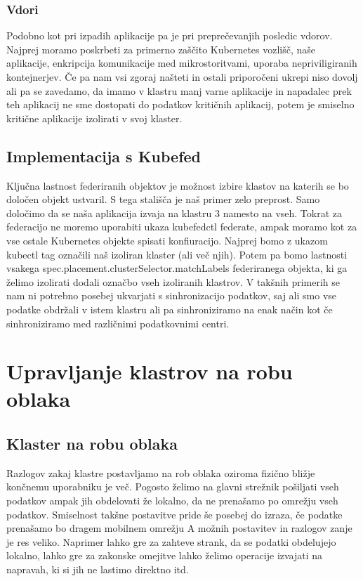 \documentclass[a4paper, 12pt]{book}
\begin{document}
\subsection{Vdori}
Podobno kot pri izpadih aplikacije pa je pri preprečevanjih posledic vdorov.
Najprej moramo poskrbeti za primerno zaščito Kubernetes vozlišč, naše aplikacije, enkripcija komunikacije med mikrostoritvami, uporaba nepriviligiranih kontejnerjev.
Če pa nam vsi zgoraj našteti in ostali priporočeni ukrepi niso dovolj ali pa se zavedamo, da imamo v klastru manj varne aplikacije in napadalec prek teh aplikacij ne sme dostopati do podatkov kritičnih aplikacij, potem je smiselno kritične aplikacije izolirati v svoj klaster.
\section{Implementacija s Kubefed}
Ključna lastnost federiranih objektov je možnost izbire klastov na katerih se bo določen objekt ustvaril. 
S tega stališča je naš primer zelo preprost.
Samo določimo da se naša aplikacija izvaja na klastru 3 namesto na vseh.
Tokrat za federacijo ne moremo uporabiti ukaza kubefedctl federate, ampak moramo kot za vse ostale Kubernetes objekte spisati konfiuracijo.
Najprej bomo z ukazom kubectl tag označili naš izoliran klaster (ali več njih).
Potem pa bomo lastnosti vsakega spec.placement.clusterSelector.matchLabels federiranega objekta, ki ga želimo izolirati dodali označbo vseh izoliranih klastrov.
V takšnih primerih se nam ni potrebno posebej ukvarjati s sinhronizacijo podatkov, saj ali smo vse podatke obdržali v istem klastru ali pa sinhroniziramo na enak način kot če sinhroniziramo med različnimi podatkovnimi centri.
\chapter{Upravljanje klastrov na robu oblaka}
\section{Klaster na robu oblaka}
Razlogov zakaj klastre postavljamo na rob oblaka oziroma fizično bližje končnemu uporabniku je več.
Pogosto želimo na glavni strežnik pošiljati vseh podatkov ampak jih obdelovati že lokalno, da ne prenašamo po omrežju vseh podatkov.
Smiselnost takšne postavitve pride še posebej do izraza, če podatke prenašamo bo dragem mobilnem omrežju
A možnih postavitev in razlogov zanje je res veliko.
Naprimer lahko gre za zahteve strank, da se podatki obdelujejo lokalno, lahko gre za zakonske omejitve lahko želimo operacije izvajati na napravah, ki si jih ne lastimo direktno itd.
\end{document}
